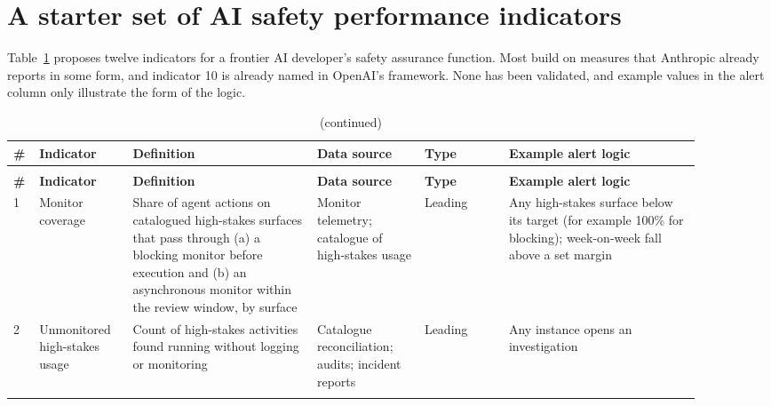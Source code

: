 \documentclass[11pt]{article}
\begin{document}
\section{A starter set of AI safety performance indicators}\label{sec:spis}

Table~\ref{tab:spi} proposes twelve indicators for a frontier AI developer's safety assurance function. Most build on measures that Anthropic already reports in some form, and indicator 10 is already named in OpenAI's framework. None has been validated, and example values in the alert column only illustrate the form of the logic.

{\footnotesize
\setlength{\tabcolsep}{3pt}\renewcommand{\arraystretch}{1.15}
\begin{longtable}{@{}>{\raggedright\arraybackslash}p{0.025\linewidth}>{\raggedright\arraybackslash}p{0.12\linewidth}>{\raggedright\arraybackslash}p{0.245\linewidth}>{\raggedright\arraybackslash}p{0.145\linewidth}>{\raggedright\arraybackslash}p{0.11\linewidth}>{\raggedright\arraybackslash}p{0.255\linewidth}@{}}
\caption{Proposed AI safety performance indicators (proposals, not validated). ``Type'' follows Doc 9859~\cite{icao2018doc9859}: leading (processes, inputs and conditions), lagging precursor (high-probability, low-severity outcomes) or lagging.}\label{tab:spi}\\
\toprule
\textbf{\#} & \textbf{Indicator} & \textbf{Definition} & \textbf{Data source} & \textbf{Type} & \textbf{Example alert logic} \\
\midrule
\endfirsthead
\caption[]{(continued)}\\
\toprule
\textbf{\#} & \textbf{Indicator} & \textbf{Definition} & \textbf{Data source} & \textbf{Type} & \textbf{Example alert logic} \\
\midrule
\endhead
\midrule
\endfoot
\bottomrule
\endlastfoot
{}1 & Monitor coverage & Share of agent actions on catalogued high-stakes surfaces that pass through (a) a blocking monitor before execution and (b) an asynchronous monitor within the review window, by surface & Monitor telemetry; catalogue of high-stakes usage & Leading & Any high-stakes surface below its target (for example 100\% for blocking); week-on-week fall above a set margin \\
\addlinespace[2pt]
{}2 & Unmonitored high-stakes usage & Count of high-stakes activities found running without logging or monitoring & Catalogue reconciliation; audits; incident reports & Leading & Any instance opens an investigation \\
\addlinespace[2pt]

\end{longtable}}
\end{document}
